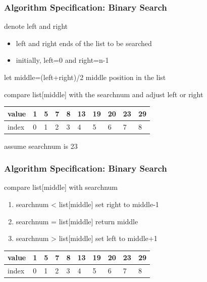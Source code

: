 \documentclass[newPxFont,sthlmFooter,nooffset]{beamer}
\begin{document}
\begin{frame}[t]
  \frametitle{Algorithm Specification: Binary Search}
denote left and right
\begin{itemize}
\item left and right ends of the list to be searched
\item initially, left=0 and right=n-1
\end{itemize}

let middle=(left+right)/2 middle position in the list

compare list[middle] with the searchnum and adjust left or right
	\begin{center}
	\begin{tabular}{| l | l | l | l | l | l | l | l | l | l |}
	\hline
	value & \cellcolor{green}1 & 5 & 7 & 8 & \cellcolor{yellow}13 & 19 & 20 & 23 & \cellcolor{red}29 \\
	\hline
	index & \cellcolor{green}0 & 1 & 2 & 3 & \cellcolor{yellow}4 & 5 & 6 & 7 & \cellcolor{red}8 \\
	\hline
	\end{tabular}
	\end{center}
\begin{center}
		\begin{small}
			 assume searchnum is 23
		\end{small}
\end{center}

\end{frame}
\begin{frame}[t]
  \frametitle{Algorithm Specification: Binary Search}
compare list[middle] with searchnum
\begin{enumerate}
\item searchnum < list[middle] set right to middle-1
\item searchnum = list[middle] return middle 
\item searchnum > list[middle] set left to middle+1
\end{enumerate}
\begin{center}
	\begin{tabular}{| l | l | l | l | l | l | l | l | l | l |}
		\hline
		value & 1 & 5 & 7 & 8 & 13 & \cellcolor{green}19 & 20 & 23 & \cellcolor{red}29 \\
		\hline
		index & 0 & 1 & 2 & 3 & 4 & \cellcolor{green}5 & 6 & 7 & \cellcolor{red}8 \\
		\hline
	\end{tabular}
\end{center}

\end{frame}
\end{document}
